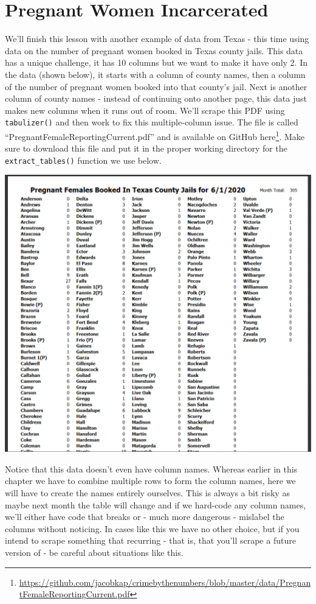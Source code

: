 \documentclass[
]{krantz}
\renewcommand{\href}[2]{#2\footnote{\url{#1}}}
\begin{document}
\hypertarget{pregnant-women-incarcerated}{%
\section{Pregnant Women Incarcerated}\label{pregnant-women-incarcerated}}

We'll finish this lesson with another example of data from Texas - this time using data on the number of pregnant women booked in Texas county jails. This data has a unique challenge, it has 10 columns but we want to make it have only 2. In the data (shown below), it starts with a column of county names, then a column of the number of pregnant women booked into that county's jail. Next is another column of county names - instead of continuing onto another page, this data just makes new columns when it runs out of room. We'll scrape this PDF using \texttt{tabulizer()} and then work to fix this multiple-column issue. The file is called ``PregnantFemaleReportingCurrent.pdf'' and is available on GitHub \href{https://github.com/jacobkap/crimebythenumbers/blob/master/data/PregnantFemaleReportingCurrent.pdf}{here}. Make sure to download this file and put it in the proper working directory for the \texttt{extract\_tables()} function we use below.

\includegraphics{images/pregnant.PNG}

Notice that this data doesn't even have column names. Whereas earlier in this chapter we have to combine multiple rows to form the column names, here we will have to create the names entirely ourselves. This is always a bit risky as maybe next month the table will change and if we hard-code any column names, we'll either have code that breaks or - much more dangerous - mislabel the columns without noticing. In cases like this we have no other choice, but if you intend to scrape something that recurring - that is, that you'll scrape a future version of - be careful about situations like this.
\end{document}
